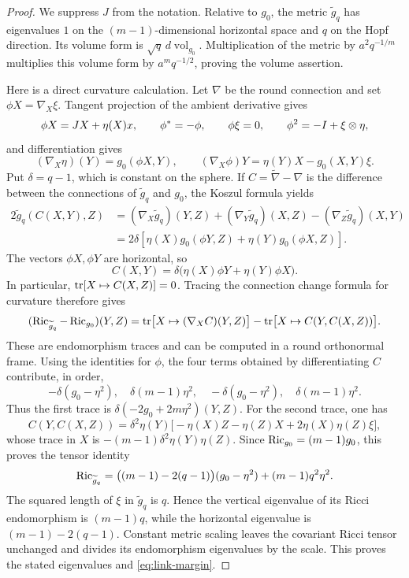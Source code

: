 \begin{proof}
We suppress \(J\) from the notation.
Relative to \(g_0\), the metric \(\widetilde g_q\) has eigenvalues \(1\)
on the \((m-1)\)-dimensional horizontal space and \(q\) on the Hopf
direction.  Its volume form is \(\sqrt q\,d\operatorname{vol}_{g_0}\).
Multiplication of the metric by \(a^2q^{-1/m}\) multiplies this volume
form by \(a^m q^{-1/2}\), proving the volume assertion.

Here is a direct curvature calculation.
Let \(\nabla\) be the round connection and set
\(\phi X=\nabla_X\xi\).  Tangent projection of the ambient derivative
gives
\[
 \phi X=JX+\eta(X)x,\qquad
 \phi^*=-\phi,\qquad \phi\xi=0,\qquad
 \phi^2=-I+\xi\otimes\eta,
\]
and differentiation gives
\[
 (\nabla_X\eta)(Y)=g_0(\phi X,Y),\qquad
 (\nabla_X\phi)Y=\eta(Y)X-g_0(X,Y)\xi.
\]
Put \(\delta=q-1\), which is constant on the sphere.
If \(C=\widetilde\nabla-\nabla\) is the difference between the
connections of \(\widetilde g_q\) and \(g_0\), the Koszul formula yields
\begin{align*}
 2\widetilde g_q(C(X,Y),Z)
 &=(\nabla_X\widetilde g_q)(Y,Z)
   +(\nabla_Y\widetilde g_q)(X,Z)
   -(\nabla_Z\widetilde g_q)(X,Y)\\
 &=2\delta\left[\eta(X)g_0(\phi Y,Z)
                    +\eta(Y)g_0(\phi X,Z)\right].
\end{align*}
The vectors \(\phi X,\phi Y\) are horizontal, so
\[
 C(X,Y)=\delta\bigl(\eta(X)\phi Y+\eta(Y)\phi X\bigr).
\]
In particular, \(\operatorname{tr}[X\mapsto C(X,Z)]=0\).
Tracing the connection change formula for curvature therefore gives
\[
 (\operatorname{Ric}_{\widetilde g_q}-\operatorname{Ric}_{g_0})(Y,Z)
 =\operatorname{tr}\bigl[X\mapsto(\nabla_XC)(Y,Z)\bigr]
  -\operatorname{tr}\bigl[X\mapsto C(Y,C(X,Z))\bigr].
\]
These are endomorphism traces and can be computed in a round
orthonormal frame.
Using the identities for \(\phi\), the four terms obtained by
differentiating \(C\) contribute, in order,
\[
 -\delta(g_0-\eta^2),\quad
 \delta(m-1)\eta^2,\quad
 -\delta(g_0-\eta^2),\quad
 \delta(m-1)\eta^2.
\]
Thus the first trace is
\(\delta(-2g_0+2m\eta^2)(Y,Z)\).
For the second trace, one has
\[
 C(Y,C(X,Z))
 =\delta^2\eta(Y)
   \bigl[-\eta(X)Z-\eta(Z)X+2\eta(X)\eta(Z)\xi\bigr],
\]
whose trace in \(X\) is
\(-(m-1)\delta^2\eta(Y)\eta(Z)\).
Since \(\operatorname{Ric}_{g_0}=(m-1)g_0\), this proves the tensor identity
\[
 \operatorname{Ric}_{\widetilde g_q}
 =\bigl((m-1)-2(q-1)\bigr)(g_0-\eta^2)
   +(m-1)q^2\eta^2.
\]
The squared length of \(\xi\) in \(\widetilde g_q\) is \(q\).
Hence the vertical eigenvalue of its Ricci endomorphism is
\((m-1)q\), while the horizontal eigenvalue is
\((m-1)-2(q-1)\).
Constant metric scaling leaves the covariant Ricci tensor unchanged
and divides its endomorphism eigenvalues by the scale.
This proves the stated eigenvalues and \eqref{eq:link-margin}.


\end{proof}
